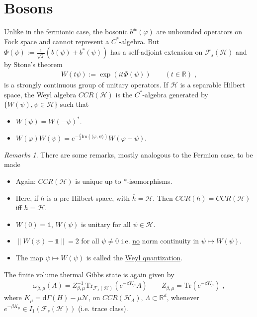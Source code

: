 \documentclass[
a4paper, %
11pt, %
onecolumn, %
openany, %
]{memoir}
\theoremstyle{definition}
\theoremstyle{remark}
\newtheorem{remarks}{Remarks}[chapter]
\theoremstyle{plain}
\begin{document}
\section{Bosons}
Unlike in the fermionic case, the bosonic $b^{\#}(\varphi)$ are unbounded operators on Fock space and cannot represent a $C^*$-algebra. But $\Phi(\psi):=\frac{1}{\sqrt{2}}(b(\psi)+b^*(\psi))$ has a self-adjoint extension on $\mathcal{F}_s(\mathcal{H})$ and by Stone's theorem \begin{align}
W(t\psi):=\exp(it\Phi(\psi))\qquad (t\in\mathbb{R})\; ,
\end{align}
is a strongly continuous group of unitary operators. If $\mathcal{H}$ is a separable Hilbert space, the Weyl algebra $CCR(\mathcal{H})$ is the $C^*$-algebra generated by $\{W(\psi),\psi\in\mathcal{H}\}$ such that \begin{itemize}
	\item $W(\psi)=W(-\psi)^*$.
	\item $W(\varphi)W(\psi)=e^{-\frac{i}{2}\mathrm{Im}(\langle\varphi,\psi\rangle)}W(\varphi+\psi)$.
\end{itemize}
\begin{remarks}
	There are some remarks, mostly analogous to the Fermion case, to be made \begin{itemize}
		\item Again: $CCR(\mathcal{H})$ is unique up to $*$-isomorphisms.
		\item Here, if $h$ is a pre-Hilbert space, with $\overline{h}=\mathcal{H}$. Then $CCR(h)=CCR(\mathcal{H})$ iff $h=\mathcal{H}$.
		\item $W(0)=\mathds{1}$, $W(\psi)$ is unitary for all $\psi\in\mathcal{H}$.
		\item $\|W(\psi)-\mathds{1}\|=2$ for all $\psi\neq 0$ i.e. \underline{no} norm continuity in $\psi\mapsto W(\psi)$.
		\item The map $\psi\mapsto W(\psi)$ is called the \underline{Weyl quantization}.
	\end{itemize}
\end{remarks}
The finite volume thermal Gibbs state is again given by \begin{align}
\omega_{\beta,\mu}(A)=Z^{-1}_{\beta,\mu}\mathrm{Tr}_{\mathcal{F}_s(\mathcal{H})}(e^{-\beta K_{\mu}}A)\qquad Z_{\beta,\mu}=\mathrm{Tr}(e^{-\beta K_{\mu}}) \label{eqn::symm_gibbs}\; ,
\end{align}
where $K_{\mu}=\mathrm{d}\Gamma(H)-\mu\mathcal{N}$, on $CCR(\mathcal{H}_{\Lambda})$, $\Lambda\subset\mathbb{R}^d$, whenever $e^{-\beta K_{\mu}}\in I_1(\mathcal{F}_s(\mathcal{H}))$ (i.e. trace class).
\end{document}
